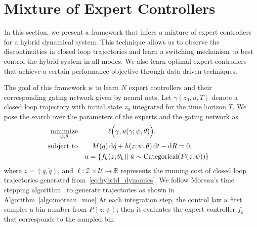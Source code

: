 \section{Mixture of Expert Controllers}
\label{sec:moe_methods}

In this section, we present a framework that infers a mixture of expert
controllers for a hybrid dynamical system. 
%
This technique allows us to observe the discontinuities in closed loop
trajectories and learn a switching mechanism to best control the hybrid system
in all modes.
%
We also learn optimal expert controllers that achieve a certain performance
objective through data-driven techniques.

The goal of this framework is to learn $N$ expert controllers and their corresponding
gating network given by neural nets.
%
Let $\gamma(z_0, u, T)$ denote a closed loop trajectory with initial state $z_0$
integrated for the time horizon $T$.
%
We pose the search over the parameters of the experts and the gating network as
\begin{equation}
    \begin{aligned}
        \underset{\psi, \theta}{\textrm{minimize}} 
        & & & \ell \Bigl(\gamma,u(\gamma; \psi, \theta) \Bigr)  , \\%
        \textrm{subject to}
        & & M(q) &\dd \dot{q} + h(z; \psi, \theta)\dd t - \dd R  = 0,\\%
        & & u = \{f_k&(z; \theta_k) | \; k  \sim \text{Categorical} (P(z; \psi)) \}
    \end{aligned}
    \label{eq:moe_opt}
\end{equation}
\noindent where $z = (q, \dot{q})$, and $\ell : \mathcal{Z} \times \mathcal{U}
\rightarrow \mathbb{R}$ represents the running cost of closed loop trajectories
generated from~\eqref{eq:hybrid_dynamics}.
%
We follow Moreau's time stepping algorithm~\cite{glocker2005formulation} to
generate trajectories as shown in Algorithm~\eqref{algo:moreau_moe}
%
At each integration step, the control law $u$ first samples a bin number from
$P(z;\psi)$; then it evaluates the expert controller $f_k$ that corresponds to
the sampled bin.
%

